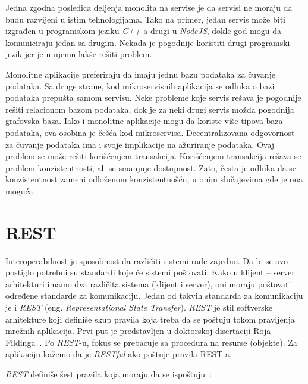 Jedna zgodna posledica deljenja monolita na servise je da servisi ne moraju da budu razvijeni u istim 
tehnologijama. Tako na primer, jedan servis može biti izgrađen u programskom jeziku \textit{C++} a drugi u 
\textit{NodeJS}, dokle god mogu da komuniciraju jedan sa drugim. Nekada je pogodnije koristiti drugi programski 
jezik jer je u njemu lakše rešiti problem.

Monolitne aplikacije preferiraju da imaju jednu bazu podataka za čuvanje podataka. Sa druge strane, kod 
mikroservisnih aplikacija se odluka o bazi podataka prepušta samom servisu. Neke probleme koje servis 
rešava je pogodnije rešiti relacionom bazom podataka, dok je za neki drugi servis možda pogodnija grafovska baza.
Iako i monolitne aplikacije mogu da koriste više tipova baza podataka, ova osobina je češća kod 
mikroservisa. Decentralizovana odgovornost za čuvanje podataka ima i svoje implikacije na ažuriranje 
podataka. Ovaj problem se može rešiti korišćenjem transakcija. Korišćenjem transakcija rešava se problem 
konzistentnosti, ali se smanjuje dostupnost. Zato, česta je odluka da se konzistentnost zameni 
odloženom konzistentnošću, u onim slučajevima gde je ona moguća. 


\section{REST}\label{sec:arhitektura-rest}

Interoperabilnost je sposobnost da različiti sistemi rade zajedno. Da bi se ovo postiglo potrebni su 
standardi koje će sistemi poštovati. Kako u klijent -- server arhitekturi imamo dva različita sistema 
(klijent i server), oni moraju poštovati određene standarde za komunikaciju. Jedan od takvih standarda za 
komunikaciju je i \textit{REST} (eng. \textit{Representational State Transfer}). \textit{REST} je stil 
softverske arhitekture koji definiše skup pravila koja treba da se poštuju tokom pravljenja mrežnih 
aplikacija. Prvi put je predstavljen u doktorskoj disertaciji Roja Fildinga~\cite{REST_Roy}. Po \textit{REST}-u, 
fokus se prebacuje sa procedura na resurse (objekte). Za aplikaciju kažemo da je \textit{RESTful} ako poštuje pravila REST-a.


\textit{REST} definiše šest pravila koja moraju da se ispoštuju~\cite{REST_API}:

